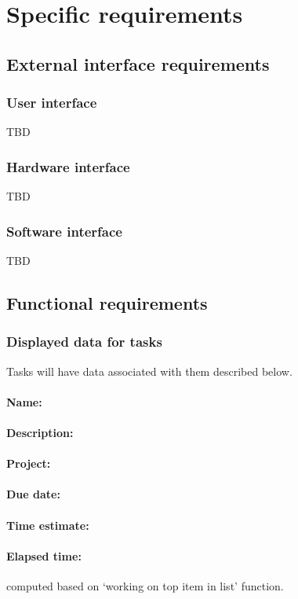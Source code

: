 \documentclass[12pt,a4paper]{article}
\begin{document}
\section{Specific requirements}

\subsection{External interface requirements}
\subsubsection{User interface}
TBD
\subsubsection{Hardware interface}
TBD
\subsubsection{Software interface}
TBD

\subsection{Functional requirements}

\subsubsection{Displayed data for tasks}
Tasks will have data associated with them described below. 
\paragraph{Name:}
\paragraph{Description:}
\paragraph{Project:} 
\paragraph{Due date:}
\paragraph{Time estimate:}
\paragraph{Elapsed time:} computed based on `working on top item in list' function.
\end{document}
